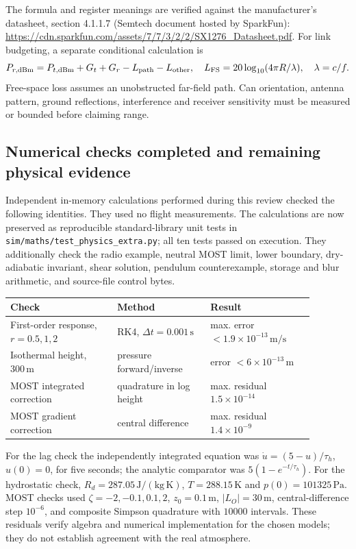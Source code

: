 The formula and register meanings are verified against the manufacturer's
datasheet, section 4.1.1.7 (Semtech document hosted by SparkFun):
\url{https://cdn.sparkfun.com/assets/7/7/3/2/2/SX1276_Datasheet.pdf}.
For link budgeting, a separate conditional calculation is
\begin{equation}
 P_{r,\rm dBm}=P_{t,\rm dBm}+G_t+G_r-L_{\rm path}-L_{\rm other},
 \quad L_{\rm FS}=20\log_{10}(4\pi R/\lambda),\quad \lambda=c/f.
\end{equation}
Free-space loss assumes an unobstructed far-field path. Can orientation,
antenna pattern, ground reflections, interference and receiver sensitivity
must be measured or bounded before claiming range.

\subsection{Numerical checks completed and remaining physical evidence}

Independent in-memory calculations performed during this review checked
the following identities. They used no flight measurements.
The calculations are now preserved as reproducible standard-library
unit tests in \texttt{sim/maths/test\_physics\_extra.py}; all ten tests
passed on execution. They additionally check the radio example, neutral
MOST limit, lower boundary, dry-adiabatic invariant, shear solution,
pendulum counterexample, storage and blur arithmetic, and source-file
control bytes.
\begin{center}
\begin{tabular}{p{0.31\linewidth}p{0.27\linewidth}p{0.30\linewidth}}
\toprule
Check & Method & Result\\
\midrule
First-order response, $r=0.5,1,2$ & RK4, $\Delta t=0.001\,\mathrm s$
 & max. error $<1.9\times10^{-13}\,\mathrm{m/s}$\\
Isothermal height, $300\,\mathrm m$ & pressure forward/inverse
 & error $<6\times10^{-13}\,\mathrm m$\\
MOST integrated correction & quadrature in log height
 & max. residual $1.5\times10^{-14}$\\
MOST gradient correction & central difference
 & max. residual $1.4\times10^{-9}$\\
\bottomrule
\end{tabular}
\end{center}
For the lag check the independently integrated equation was
$\dot u=(5-u)/\tau_h$, $u(0)=0$, for five seconds; the analytic comparator
was $5(1-e^{-t/\tau_h})$. For the hydrostatic check,
$R_d=287.05\,\mathrm{J/(kg\,K)}$, $T=288.15\,\mathrm K$ and
$p(0)=101325\,\mathrm{Pa}$. MOST checks used $\zeta=-2,-0.1,0.1,2$,
$z_0=0.1\,\mathrm m$, $|L_O|=30\,\mathrm m$, central-difference step
$10^{-6}$, and composite Simpson quadrature with $10000$ intervals.
These residuals verify algebra and numerical implementation for the chosen
models; they do not establish agreement with the real atmosphere.

